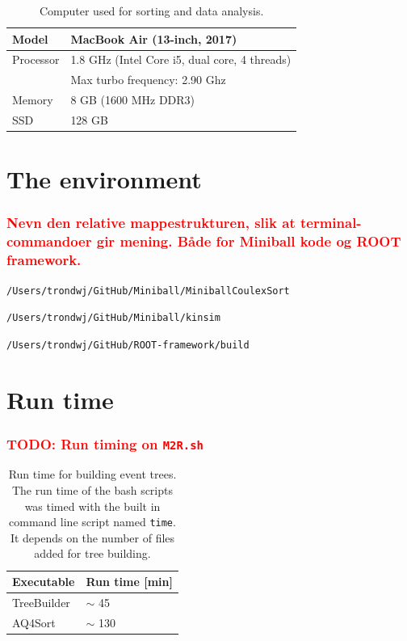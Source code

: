 \documentclass[twoside,english]{uiofysmaster/uiofysmaster}
\begin{document}
\begin{appendices}
\begin{table}[H] 
	\centering 
	\caption{Computer used for sorting and data analysis.}
	\label{tab:PC}
	\begin{tabular}{ll}
		\hline
		Model & MacBook Air (13-inch, 2017) \\
		\hline
		Processor  &  1.8 GHz (Intel Core i5, dual core, 4 threads)  \\
						 &  Max turbo frequency: 2.90 Ghz  \\
		Memory     &  8 GB (1600 MHz DDR3)  \\
		SSD		     &  128 GB  \\
		\hline
	\end{tabular}
\end{table}


\section{The environment}
\subsubsection*{\textcolor{red}{Nevn den relative mappestrukturen, slik at terminal-commandoer gir mening. Både for Miniball kode og ROOT framework.}}

\begin{lstlisting}[language=sh]
/Users/trondwj/GitHub/Miniball/MiniballCoulexSort
\end{lstlisting}

\begin{lstlisting}[language=sh]
/Users/trondwj/GitHub/Miniball/kinsim
\end{lstlisting}

\begin{lstlisting}[language=sh]
/Users/trondwj/GitHub/ROOT-framework/build
\end{lstlisting}


\section{Run time}

\subsubsection{\textcolor{red}{TODO: Run timing on \texttt{M2R.sh}}}

\begin{table}[H] 
	\centering 
	\caption{Run time for building event trees. The run time of the bash scripts was timed with the built in command line script named \texttt{time}. It depends on the number of files added for tree building.}
	\label{tab:run_time}
	\begin{tabular}{ll}
		\hline
		Executable   &  Run time [min] \\
		\hline
		TreeBuilder  &  $\sim$ 45   \\
		AQ4Sort       &  $\sim$ 130  \\
		\hline
	\end{tabular}
\end{table}




\end{appendices}
\end{document}

